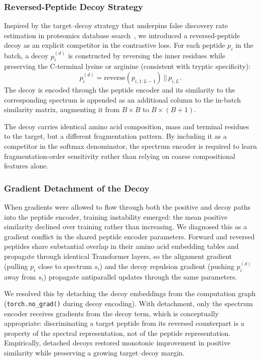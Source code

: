 \documentclass[pdflatex,sn-mathphys-num]{sn-jnl}%
\theoremstyle{thmstyleone}%
\theoremstyle{thmstyletwo}%
\theoremstyle{thmstylethree}%
\begin{document}
\subsubsection{Reversed-Peptide Decoy Strategy}

Inspired by the target--decoy strategy that underpins false discovery rate estimation in proteomics database search~\cite{elias2007targetdecoy}, we introduced a reversed-peptide decoy as an explicit competitor in the contrastive loss. For each peptide $p_i$ in the batch, a decoy $p_i^{(d)}$ is constructed by reversing the inner residues while preserving the C-terminal lysine or arginine (consistent with tryptic specificity):
\begin{equation}
p_i^{(d)} = \mathrm{reverse}(p_{i,1:L-1}) \,||\, p_{i,L}.
\end{equation}
The decoy is encoded through the peptide encoder and its similarity to the corresponding spectrum is appended as an additional column to the in-batch similarity matrix, augmenting it from $B \times B$ to $B \times (B+1)$.

The decoy carries identical amino acid composition, mass and terminal residues to the target, but a different fragmentation pattern. By including it as a competitor in the softmax denominator, the spectrum encoder is required to learn fragmentation-order sensitivity rather than relying on coarse compositional features alone.

\subsubsection{Gradient Detachment of the Decoy}

When gradients were allowed to flow through both the positive and decoy paths into the peptide encoder, training instability emerged: the mean positive similarity declined over training rather than increasing. We diagnosed this as a gradient conflict in the shared peptide encoder parameters. Forward and reversed peptides share substantial overlap in their amino acid embedding tables and propagate through identical Transformer layers, so the alignment gradient (pulling $p_i$ close to spectrum $s_i$) and the decoy repulsion gradient (pushing $p_i^{(d)}$ away from $s_i$) propagate antiparallel updates through the same parameters.

We resolved this by detaching the decoy embeddings from the computation graph (\texttt{torch.no\_grad()} during decoy encoding). With detachment, only the spectrum encoder receives gradients from the decoy term, which is conceptually appropriate: discriminating a target peptide from its reversed counterpart is a property of the spectral representation, not of the peptide representation. Empirically, detached decoys restored monotonic improvement in positive similarity while preserving a growing target--decoy margin.
\end{document}
